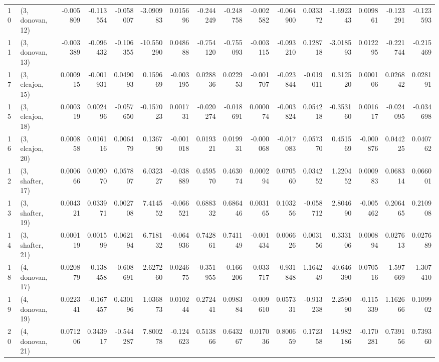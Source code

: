 \begin{tabular}{llrrrrrrrrrrrrrr}
10 &  (3, donovan, 12) &  -0.005809 & -0.113554 & -0.058007 &  -3.090983 &  0.015696 &  -0.244249 & -0.248758 & -0.002582 & -0.064900 &  0.033372 &  -1.692343 &  0.009861 & -0.123291 & -0.123593 \\
11 &  (3, donovan, 13) &  -0.003389 & -0.096432 & -0.106355 & -10.550290 &  0.048688 &  -0.754120 & -0.755093 & -0.003115 & -0.093210 &  0.128718 &  -3.018593 &  0.012295 & -0.221744 & -0.215469 \\
17 &  (3, elcajon, 15) &   0.000915 & -0.001931 &  0.049093 &   0.159669 & -0.003195 &   0.028836 &  0.022953 & -0.001707 & -0.023844 & -0.019011 &   0.312520 &  0.000106 &  0.026842 &  0.028191 \\
15 &  (3, elcajon, 18) &   0.000319 &  0.002496 & -0.057650 &  -0.157023 &  0.001731 &  -0.020274 & -0.018691 &  0.000074 & -0.003824 &  0.054218 &  -0.353160 &  0.001617 & -0.024095 & -0.034698 \\
16 &  (3, elcajon, 20) &   0.000858 &  0.016116 &  0.006479 &   0.136790 & -0.001018 &   0.019321 &  0.019931 & -0.000068 & -0.017083 &  0.057370 &   0.451569 & -0.000876 &  0.044225 &  0.040762 \\
12 &  (3, shafter, 17) &   0.000666 &  0.009070 &  0.057807 &   6.032327 & -0.038889 &   0.459570 &  0.463074 &  0.000294 &  0.070560 &  0.034252 &   1.220452 &  0.000983 &  0.068314 &  0.066001 \\
13 &  (3, shafter, 19) &   0.004321 &  0.033971 &  0.002708 &   7.414552 & -0.066521 &   0.688332 &  0.686446 &  0.003165 &  0.103256 & -0.058712 &   2.804690 & -0.005462 &  0.206465 &  0.210908 \\
14 &  (3, shafter, 21) &   0.000119 &  0.001599 &  0.062194 &   6.718132 & -0.064936 &   0.742861 &  0.741149 & -0.001434 &  0.006626 &  0.003156 &   0.333106 &  0.000894 &  0.027613 &  0.027689 \\
18 &  (4, donovan, 17) &   0.020879 & -0.138458 & -0.608691 &  -2.627260 &  0.024675 &  -0.351955 & -0.166206 & -0.033717 & -0.931848 &  1.164249 & -40.646390 &  0.070516 & -1.597669 & -1.307410 \\
19 &  (4, donovan, 19) &   0.022341 & -0.167457 &  0.430196 &   1.036873 &  0.010244 &   0.272441 &  0.098384 & -0.009610 &  0.057331 & -0.913238 &   2.259090 & -0.115339 &  1.162666 &  0.109902 \\
20 &  (4, donovan, 21) &   0.071206 &  0.343917 & -0.544287 &   7.800278 & -0.124623 &   0.513866 &  0.643267 &  0.017036 &  0.800659 &  0.172358 &  14.982186 & -0.170281 &  0.739156 &  0.739360 \\

\end{tabular}

